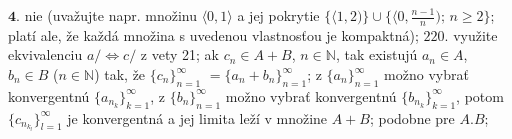 $\boldsymbol{4.}$ nie (uvažujte napr. množinu $\langle 0,1\rangle$ a jej  pokrytie $\lbrace \langle 1, 2 ) \rbrace \cup \lbrace\langle 0, \frac{n-1}{n} ); \, n \geq 2 \rbrace $; platí ale,  že každá množina s uvedenou vlastnosťou je kompaktná);
$\boxed{220.}$ využite ekvivalenciu $a/ \iff c/$ z vety 21; ak $c_{n} \in A+B$, $n \in \mathbb{N} $, tak existujú $a_{n} \in A$, $b_{n} \in B$ ($n \in \mathbb{N} $) tak, že $\lbrace c_{n} \rbrace _{n=1}  ^{\infty}$ $=\lbrace a _{n}+b_{n} \rbrace _{n=1}  ^{\infty}$; z $\lbrace a_{n} \rbrace _{n=1}  ^{\infty}$ možno vybrať konvergentnú $\lbrace a_{n_{k}} \rbrace _{k=1}  ^{\infty}$, z $\lbrace b_{n} \rbrace _{n=1}  ^{\infty}$ možno vybrať konvergentnú $\lbrace b_{n_{k}} \rbrace _{k=1}  ^{\infty}$, potom  $\lbrace c_{n_{k_{l}}} \rbrace _{l=1}  ^{\infty}$ je konvergentná a jej limita leží v množine  $A+B $; podobne pre $A.B$;
 



